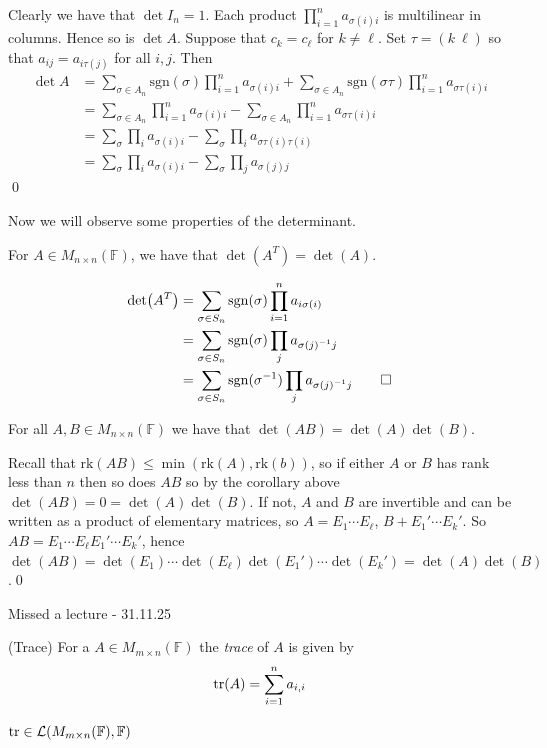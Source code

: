 \documentclass{article}
\newcommand{\F}{\mathbb{F}}
\newcommand{\rk}{\mathrm{rk}}
\newcommand{\sgn}{\mathrm{sgn}}
\begin{document}
Clearly we have that $ \det I_n=1 $. Each product $ \prod_{i=1}^na_{\sigma(i)i} $ is multilinear in columns. Hence so is $ \det A $. Suppose that $ c_k=c_\ell $ for $ k\ne \ell $. Set $ \tau=(k\ \ell) $ so that $ a_{ij}=a_{i\tau(j)} $ for all $ i,j $. Then
\begin{align*}
	\det A&=\sum_{\sigma\in A_n}\sgn(\sigma)\prod_{i=1}^n a_{\sigma(i)i}+\sum_{\sigma\in A_n}\sgn(\sigma\tau)\prod_{i=1}^n a_{\sigma\tau(i)i}\\
	      &= \sum_{\sigma\in A_n}\prod_{i=1}^na_{\sigma(i)i}-\sum_{\sigma\in A_n}\prod_{i=1}^n a_{\sigma\tau(i)i}\\
	      &=\sum_\sigma\prod_ia_{\sigma(i)i}-\sum_\sigma\prod_ia_{\sigma\tau(i)\tau(i)}\\
	      &=\sum_\sigma\prod_ia_{\sigma(i)i}-\sum_\sigma\prod_ja_{\sigma(j)j}
\end{align*}\qed\par
Now we will observe some properties of the determinant.
\begin{lemma}
	For $ A\in M_{n\times n}(\F) $, we have that $ \det(A^T)=\det(A) $.
\end{lemma}
\pf 
\begin{align*}
	\det(A^T)&=\sum_{\sigma\in S_n}\sgn(\sigma)\prod_{i=1}^na_{i\sigma(i)}\\
		 &= \sum_{\sigma\in S_n}\sgn(\sigma)\prod_ja_{\inv{\sigma(j)}j}\\
		 &=\sum_{\sigma\in S_n}\sgn(\inv\sigma)\prod_ja_{\inv{\sigma(j)}j}\qed
\end{align*}
\begin{proposition}
	For all $ A,B\in M_{n\times n}(\F) $ we have that $ \det(AB)=\det(A)\det(B) $.
\end{proposition}
\pf Recall that $ \rk(AB)\le \min(\rk(A),\rk(b)) $, so if either $ A $ or $ B $ has rank less than $ n $ then so does $ AB $ so by the corollary above $ \det(AB)=0=\det(A)\det(B) $. If not, $ A $ and $ B $ are invertible and can be written as a product of elementary matrices, so $ A=E_1\cdots E_\ell $, $ B+E_1'\cdots E_k' $. So $ AB=E_1\cdots E_\ell E_1'\cdots E_k' $, hence $ \det(AB)=\det(E_1)\cdots \det(E_\ell)\det(E_1')\cdots \det(E_k')=\det(A)\det(B)$.\qed\par
Missed a lecture - 31.11.25
\begin{definition}
	(Trace) For a $ A\in M_{m\times n}(\F) $ the \textit{trace} of $ A $ is given by
	\[
		\tr(A)=\sum_{i=1}^na_{i,i}
	\]
\end{definition}
\begin{remark}
	$ \tr \in \mathcal L(M_{m\times n}(\F),\F) $
\end{remark}
\end{document}
